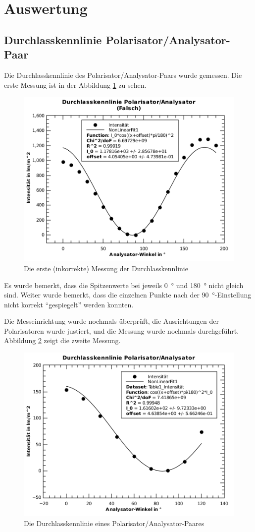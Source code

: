 \section{Auswertung}

\subsection{Durchlasskennlinie Polarisator/Analysator-Paar}

Die  Durchlasskennlinie  des Polarisator/Analysator-Paars  wurde  gemessen.  Die
erste   Messung  ist  in  der  Abbildung  \ref{fig:aufgabe-3_falsch}  zu  sehen.

\begin{figure}[H]
    \centering
    \includegraphics[width=.6\linewidth]{images/aufgabe-3_falsch.pdf}
    \caption{Die erste (inkorrekte) Messung der Durchlasskennlinie}
    \label{fig:aufgabe-3_falsch}
\end{figure}

Es  wurde  bemerkt,  dass  die  Spitzenwerte  bei  jeweils  \SI{0}{\degree}  und
\SI{180}{\degree} nicht gleich sind. Weiter wurde bemerkt,  dass  die  einzelnen
Punkte nach der \SI{90}{\degree}-Einstellung nicht korrekt ``gespiegelt'' werden
konnten.

Die  Messeinrichtung   wurde   nochmals  \"uberpr\"uft,  die  Ausrichtungen  der
Polarisatoren  wurde  justiert,  und die Messung wurde nochmals  durchgef\"uhrt.
Abbildung \ref{fig:aufgabe-3} zeigt die zweite Messung.

\begin{figure}[H]
    \centering
    \includegraphics[width=.6\linewidth]{images/aufgabe-3.pdf}
    \caption{Die Durchlasskennlinie eines Polarisator/Analysator-Paares}
    \label{fig:aufgabe-3}
\end{figure}

